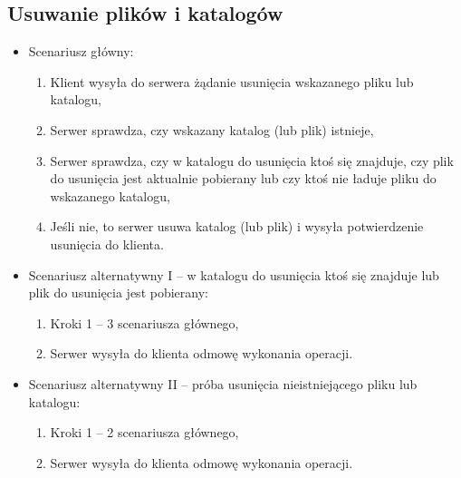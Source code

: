\documentclass[8pt,a4paper]{article}
\begin{document}
\subsection{Usuwanie plików i katalogów}
\begin{itemize}
    \item Scenariusz główny:
    \begin{enumerate}
        \item Klient wysyła do serwera żądanie usunięcia wskazanego pliku lub katalogu,
        \item Serwer sprawdza, czy wskazany katalog (lub plik) istnieje,
        \item Serwer sprawdza, czy w katalogu do usunięcia ktoś się znajduje, czy plik do usunięcia jest aktualnie pobierany lub czy ktoś nie ładuje pliku do wskazanego katalogu,
        \item Jeśli nie, to serwer usuwa katalog (lub plik) i wysyła potwierdzenie usunięcia do klienta.
    \end{enumerate}

    \item Scenariusz alternatywny I -- w katalogu do usunięcia ktoś się znajduje lub plik do usunięcia jest pobierany:
    \begin{enumerate}
        \item Kroki 1 -- 3 scenariusza głównego,
        \item Serwer wysyła do klienta odmowę wykonania operacji.
    \end{enumerate}

    \item Scenariusz alternatywny II -- próba usunięcia nieistniejącego pliku lub katalogu:
    \begin{enumerate}
        \item Kroki 1 -- 2 scenariusza głównego,
        \item Serwer wysyła do klienta odmowę wykonania operacji.
    \end{enumerate}
\end{itemize}
\end{document}

